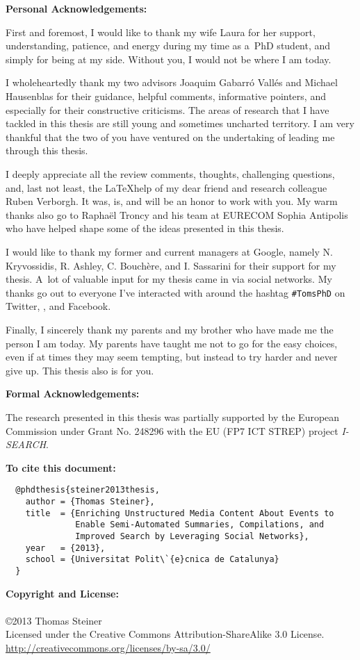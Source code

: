 \begin{acknowledgements}

\textbf{Personal Acknowledgements:}

First and foremost, I would like to thank my wife Laura
for her support, understanding, patience, and energy
during my time as a~PhD student, and simply for being at my side.
Without you, I would not be where I am today.

I wholeheartedly thank my two advisors Joaquim Gabarró Vallés
and Michael Hausenblas for their guidance, helpful comments,
informative pointers, and especially
for their constructive criticisms.
The areas of research that I have tackled in this thesis
are still young and sometimes uncharted territory.
I am very thankful that the two of you have ventured
on the undertaking of leading me through this thesis.

I deeply appreciate all the review comments, thoughts, challenging questions,
and, last not least, the \LaTeX help of my dear friend
and research colleague Ruben Verborgh.
It was, is, and will be an honor to work with you.
My warm thanks also go to Raphaël Troncy and his team
at EURECOM Sophia Antipolis
who have helped shape some of the ideas presented in this thesis.

I would like to thank my former and current managers at Google,
namely N. Kryvossidis, R. Ashley, C. Bouchère, and I. Sassarini
for their support for my thesis.
A~lot of valuable input for my thesis came in via social networks.
My thanks go out to everyone I've interacted with
around the hashtag \texttt{\#TomsPhD}
on Twitter, \googleplus, and Facebook.

Finally, I sincerely thank my parents and my brother
who have made me the person I am today.
My parents have taught me
not to go for the easy choices, even
if at times they may seem tempting,
but instead to try harder and never give up.
This thesis also is for you.

\textbf{Formal Acknowledgements:}

The research presented in this thesis
was partially supported by the European Commission
under Grant No. 248296 with the EU (FP7 ICT STREP)
project \mbox{\emph{I-SEARCH}}.

\vspace{40mm}

\textbf{To cite this document:}

\small
\begin{verbatim}
  @phdthesis{steiner2013thesis,
    author = {Thomas Steiner},
    title  = {Enriching Unstructured Media Content About Events to
              Enable Semi-Automated Summaries, Compilations, and
              Improved Search by Leveraging Social Networks},
    year   = {2013},
    school = {Universitat Polit\`{e}cnica de Catalunya}
  }
\end{verbatim}

\normalsize

\vspace{10mm}
\textbf{Copyright and License:}\\\\
\small \copyright \normalsize 2013 Thomas Steiner\\
Licensed under the Creative Commons Attribution-ShareAlike 3.0 License.\\
\url{http://creativecommons.org/licenses/by-sa/3.0/}

\end{acknowledgements}
